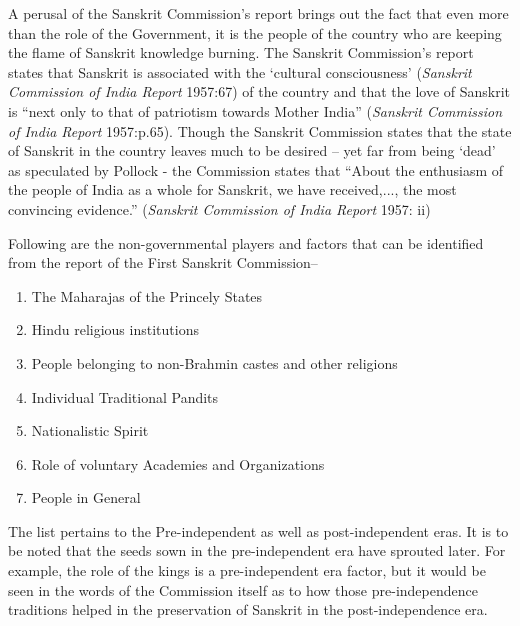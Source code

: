 A perusal of the Sanskrit Commission’s report brings out the fact that even more than the role of the Government, it is the people of the country who are keeping the flame of Sanskrit knowledge burning. The Sanskrit Commission’s report states that Sanskrit is associated with the ‘cultural consciousness’ ({\sl Sanskrit Commission of India Report} 1957:67) of the country and that the love of Sanskrit is “next only to that of patriotism towards Mother India” ({\sl Sanskrit Commission of India Report} 1957:p.65). Though the Sanskrit Commission states that the state of Sanskrit in the country leaves much to be desired – yet far from being ‘dead’ as speculated by Pollock - the Commission states that “About the enthusiasm of the people of India as a whole for Sanskrit, we have received,..., the most convincing evidence.” ({\sl Sanskrit Commission of India Report} 1957: ii)

Following are the non-governmental players and factors that can be identified from the report of the First Sanskrit Commission– 
\renewcommand\theenumi{\alph{enumi}}
\renewcommand\labelenumi{(\theenumi)}
\begin{enumerate}
\itemsep=0pt
\item The Maharajas of the Princely States
\item Hindu religious institutions
\item People belonging to non-Brahmin castes and other religions            
\item Individual Traditional Pandits
\item Nationalistic Spirit
\item Role of voluntary Academies and Organizations
\item People in General 
\end{enumerate}

The list pertains to the Pre-independent as well as post-independent eras. It is to be noted that the seeds sown in the pre-independent era have sprouted later. For example, the role of the kings is a pre-independent era factor, but it would be seen in the words of the Commission itself as to how those pre-independence traditions helped in the preservation of Sanskrit in the post-independence era. 

